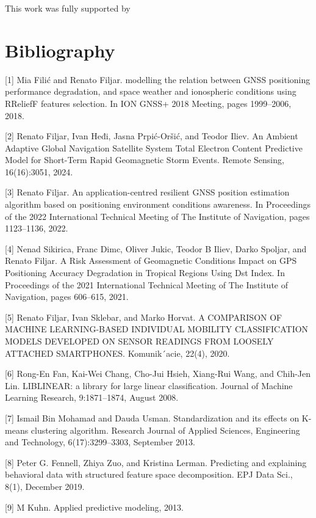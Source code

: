 \documentclass[preprint,12pt]{elsarticle}
\begin{document}
This work was fully supported by

\section{Bibliography}
[1] Mia Filić and Renato Filjar. modelling the relation between GNSS positioning performance degradation, and space weather and ionospheric conditions using RReliefF features selection. In ION GNSS+ 2018 Meeting, pages 1999–2006, 2018. 

[2] Renato Filjar, Ivan Heđi, Jasna Prpić-Oršić, and Teodor Iliev. An Ambient Adaptive Global Navigation Satellite System Total Electron Content Predictive Model for Short-Term Rapid Geomagnetic Storm Events. Remote Sensing, 16(16):3051, 2024. 

[3] Renato Filjar. An application-centred resilient GNSS position estimation algorithm based on positioning environment conditions awareness. In Proceedings of the 2022 International Technical Meeting of The Institute of Navigation, pages 1123–1136, 2022. 

[4] Nenad Sikirica, Franc Dimc, Oliver Jukic, Teodor B Iliev, Darko Spoljar, and Renato Filjar. A Risk Assessment of Geomagnetic Conditions Impact on GPS Positioning Accuracy Degradation in Tropical Regions Using Dst Index. In Proceedings of the 2021 International Technical Meeting of The Institute of Navigation, pages 606–615, 2021. 

[5] Renato Filjar, Ivan Sklebar, and Marko Horvat. A COMPARISON OF MACHINE LEARNING-BASED INDIVIDUAL MOBILITY CLASSIFICATION MODELS DEVELOPED ON SENSOR READINGS FROM LOOSELY ATTACHED SMARTPHONES. Komunik´acie, 22(4), 2020. 

[6] Rong-En Fan, Kai-Wei Chang, Cho-Jui Hsieh, Xiang-Rui Wang, and Chih-Jen Lin. LIBLINEAR: a library for large linear classification. Journal of Machine Learning Research, 9:1871–1874, August 2008. 

[7] Ismail Bin Mohamad and Dauda Usman. Standardization and its effects on K-means clustering algorithm. Research Journal of Applied Sciences, Engineering and Technology, 6(17):3299–3303, September 2013. 

[8] Peter G. Fennell, Zhiya Zuo, and Kristina Lerman. Predicting and explaining behavioral data with structured feature space decomposition. EPJ Data Sci., 8(1), December 2019. 

[9] M Kuhn. Applied predictive modeling, 2013. 
\end{document}
